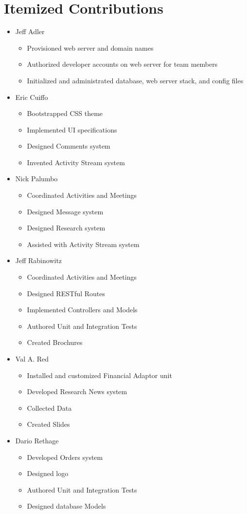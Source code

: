 \section{Itemized Contributions}

\begin{itemize}
\item Jeff Adler
	\begin{itemize}
	\item Provisioned web server and domain names
	\item Authorized developer accounts on web server for team members
	\item Initialized and administrated database, web server stack, and config files
	\end{itemize}
\item Eric Cuiffo
	\begin{itemize}
	\item Bootstrapped CSS theme
	\item Implemented UI specifications
	\item Designed Comments system
	\item Invented Activity Stream system
	\end{itemize}
\item Nick Palumbo
	\begin{itemize}
	\item Coordinated Activities and Meetings
	\item Designed Message system
	\item Designed Research system
	\item Assisted with Activity Stream system
	\end{itemize}
\item Jeff Rabinowitz
	\begin{itemize}
	\item Coordinated Activities and Meetings
	\item Designed RESTful Routes
	\item Implemented Controllers and Models
	\item Authored Unit and Integration Tests
	\item Created Brochures
	\end{itemize}
\item Val A. Red
	\begin{itemize}
	\item Installed and customized Financial Adaptor unit
	\item Developed Research News system
	\item Collected Data
	\item Created Slides
	\end{itemize}
\item Dario Rethage
	\begin{itemize}
	\item Developed Orders system
	\item Designed logo
	\item Authored Unit and Integration Tests
	\item Designed database Models
	\end{itemize}
\end{itemize}
